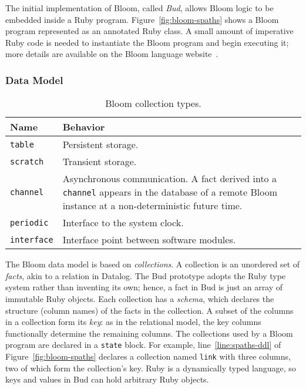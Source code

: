 The initial implementation of Bloom, called \emph{Bud}, allows Bloom logic to be
embedded inside a Ruby program. Figure~\ref{fig:bloom-spaths} shows a Bloom
program represented as an annotated Ruby class. A small amount of imperative
Ruby code is needed to instantiate the Bloom program and begin executing it;
more details are available on the Bloom language website~\cite{bloom}.

\subsubsection{Data Model}
\begin{table}[t]
\centering
\begin{tabular}{|l|p{2.32in}|}
\hline
\textbf{Name} & \textbf{Behavior }\\
\hline
\texttt{table} & Persistent storage.\\
\texttt{scratch} & Transient storage.\\
\texttt{channel} & Asynchronous communication. A fact derived into a \texttt{channel} appears in the
database of a remote Bloom instance at a non-deterministic future time.\\
\texttt{periodic} & Interface to the system clock.\\
\texttt{interface} & Interface point between software modules.\\
\hline
\end{tabular}
\caption{Bloom collection types.}
\label{tbl:bloom-collections}
\end{table}

The Bloom data model is based on \emph{collections}.  A collection is an
unordered set of \emph{facts}, akin to a relation in Datalog. The Bud prototype
adopts the Ruby type system rather than inventing its own; hence, a fact in Bud
is just an array of immutable Ruby objects. Each collection has a \emph{schema},
which declares the structure (column names) of the facts in the collection. A
subset of the columns in a collection form its \emph{key}: as in the relational
model, the key columns functionally determine the remaining columns. The
collections used by a Bloom program are declared in a \texttt{state} block. For
example, line~\ref{line:spaths-ddl} of Figure~\ref{fig:bloom-spaths} declares a
collection named \texttt{link} with three columns, two of which form the
collection's key. Ruby is a dynamically typed language, so keys and values in
Bud can hold arbitrary Ruby objects.

